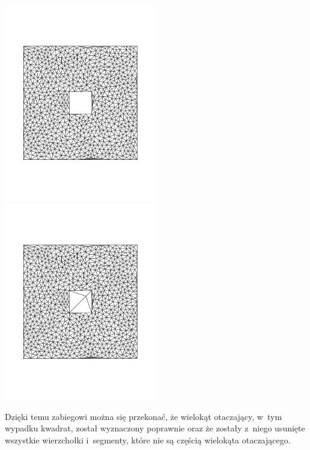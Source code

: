 \documentclass[a4paper]{article} \usepackage{setspace}
\begin{document}
\includegraphics[width=0.5\textwidth]{kwadrat_empty.pdf}
\includegraphics[width=0.5\textwidth]{kwadrat_full.pdf}

Dzięki temu zabiegowi można się przekonać, że wielokąt otaczający, w~tym wypadku kwadrat, został wyznaczony poprawnie oraz że zostały z~niego usunięte wszystkie wierzchołki i~segmenty, które nie są częścią wielokąta otaczającego.
\end{document}
